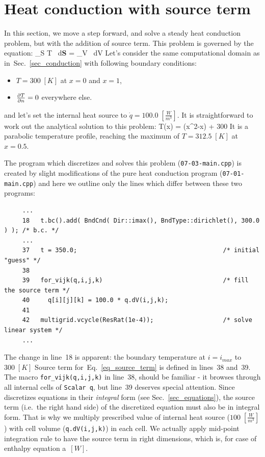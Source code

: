\section{Heat conduction with source term}
\label{sec_source_term}

In this section, we move a step forward, and solve a steady heat
conduction problem, but with the addition of source term.
This problem is governed by the equation:
%
\be
         \int_S \lambda \nabla T \, d{\bf S}
       = \int_V  \, dV     
       \; \; \; \;
       [W]
  \label{eq_source_term}
\ee
%
Let's consider the same computational domain as in~Sec.~\ref{sec_conduction}
with following boundary conditions:
%
\begin{itemize}
  \item $T = 300 \; [K]$ at $x = 0$ and $x = 1$,
  \item $\frac{\partial T}{\partial n} = 0$ everywhere else. 
\end{itemize}
% 
and let's set the internal heat source to $\dot{q} = 100.0 \; [\frac{W}{m^3}]$.
It is straightforward to work out the analytical solution to this problem:
%
\be
  T(x) =  (x^2-x) + 300 \; \; \; \; \; [K]
  \label{eq_source_term_solution}
\ee
%
It is a parabolic temperature profile, reaching the maximum of $T = 312.5 \; [K]$
at $x=0.5$.

The program which discretizes and solves this problem ({\tt 07-03-main.cpp})
is created by slight modifications of the pure heat conduction program 
({\tt 07-01-main.cpp}) and here we outline only the lines which differ
between these two programs:
%
{\small \begin{verbatim}
     ...
     18   t.bc().add( BndCnd( Dir::imax(), BndType::dirichlet(), 300.0 ) ); /* b.c. */
     ...
     37   t = 350.0;                                        /* initial "guess" */
     38
     39   for_vijk(q,i,j,k)                                 /* fill the source term */
     40     q[i][j][k] = 100.0 * q.dV(i,j,k);
     41
     42   multigrid.vcycle(ResRat(1e-4));                   /* solve linear system */
     ...
\end{verbatim}}
%
The change in line~18 is apparent: the boundary temperature at $i=i_{max}$ to~$300 \; [K]$
Source term for~Eq.~\ref{eq_source_term} is defined in lines~38 and~39. The macro 
{\tt for\_vijk(q,i,j,k)} in line~38, should be familiar - it browses through all internal cells of
{\tt Scalar q}, but line~39 deserves special attention. Since {\psiboil} discretizes equations
in their {\em integral} form (see Sec.~\ref{sec_equations}), the source term (i.e.\ the right
hand side) of the discretized equation must also be in integral form. That is why we multiply
prescribed value of internal heat source ($100 \; [\frac{W}{m^3}]$) with cell volume ({\tt q.dV(i,j,k)})
in each cell. We actually apply mid-point integration rule to have the source term in
right dimensions, which is, for case of enthalpy equation a~$[W]$. 

